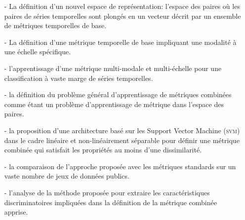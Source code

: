 \begin{itemize}
	\item[-] La définition d'un nouvel espace de représentation: l'espace des paires où les paires de séries temporelles sont plongés en un vecteur décrit par un ensemble de métriques temporelles de base.
	\item[-] La définition d'une métrique temporelle de base impliquant une modalité à une échelle spécifique.
	\item[-] l'apprentissage d'une métrique multi-modale et multi-échelle pour une classification à vaste marge de séries temporelles.
	\item[-] la définition du problème général d'apprentissage de métriques combinées comme étant un problème d'apprentissage de métrique dans l'espace des paires.
	\item[-] la proposition d'une architecture basé sur les Support Vector Machine (\textsc{svm}) dans le cadre linéaire et non-linéairement séparable pour définir une métrique combinée qui satisfait les propriétés au moins d'une dissimilarité.
	\item[-] la comparaison de l'approche proposée avec les métriques standards sur un vaste nombre de jeux de données publics.
	\item[-] l'analyse de la méthode proposée pour extraire les caractéristiques discriminatoires impliquées dans la définition de la métrique combinée apprise.
\end{itemize}


